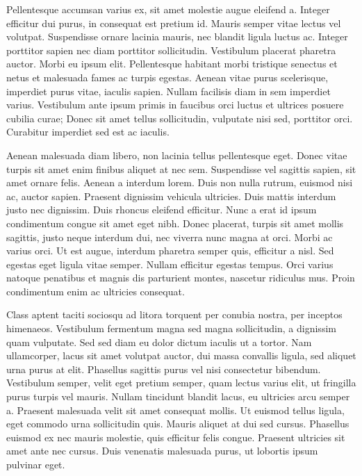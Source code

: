 Pellentesque accumsan varius ex, sit amet molestie augue eleifend a. Integer
efficitur dui purus, in consequat est pretium id. Mauris semper vitae lectus
vel volutpat. Suspendisse ornare lacinia mauris, nec blandit ligula luctus ac.
Integer porttitor sapien nec diam porttitor sollicitudin. Vestibulum placerat
pharetra auctor. Morbi eu ipsum elit. Pellentesque habitant morbi tristique
senectus et netus et malesuada fames ac turpis egestas. Aenean vitae purus
scelerisque, imperdiet purus vitae, iaculis sapien. Nullam facilisis diam in
sem imperdiet varius. Vestibulum ante ipsum primis in faucibus orci luctus et
ultrices posuere cubilia curae; Donec sit amet tellus sollicitudin, vulputate
nisi sed, porttitor orci. Curabitur imperdiet sed est ac iaculis.

Aenean malesuada diam libero, non lacinia tellus pellentesque eget. Donec vitae
turpis sit amet enim finibus aliquet at nec sem. Suspendisse vel sagittis
sapien, sit amet ornare felis. Aenean a interdum lorem. Duis non nulla rutrum,
euismod nisi ac, auctor sapien. Praesent dignissim vehicula ultricies. Duis
mattis interdum justo nec dignissim. Duis rhoncus eleifend efficitur. Nunc a
erat id ipsum condimentum congue sit amet eget nibh. Donec placerat, turpis sit
amet mollis sagittis, justo neque interdum dui, nec viverra nunc magna at orci.
Morbi ac varius orci. Ut est augue, interdum pharetra semper quis, efficitur a
nisl. Sed egestas eget ligula vitae semper. Nullam efficitur egestas tempus.
Orci varius natoque penatibus et magnis dis parturient montes, nascetur
ridiculus mus. Proin condimentum enim ac ultricies consequat.

Class aptent taciti sociosqu ad litora torquent per conubia nostra, per
inceptos himenaeos. Vestibulum fermentum magna sed magna sollicitudin, a
dignissim quam vulputate. Sed sed diam eu dolor dictum iaculis ut a tortor. Nam
ullamcorper, lacus sit amet volutpat auctor, dui massa convallis ligula, sed
aliquet urna purus at elit. Phasellus sagittis purus vel nisi consectetur
bibendum. Vestibulum semper, velit eget pretium semper, quam lectus varius
elit, ut fringilla purus turpis vel mauris. Nullam tincidunt blandit lacus, eu
ultricies arcu semper a. Praesent malesuada velit sit amet consequat mollis. Ut
euismod tellus ligula, eget commodo urna sollicitudin quis. Mauris aliquet at
dui sed cursus. Phasellus euismod ex nec mauris molestie, quis efficitur felis
congue. Praesent ultricies sit amet ante nec cursus. Duis venenatis malesuada
purus, ut lobortis ipsum pulvinar eget.

